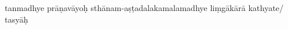    \begin{ekdosis}
      \begin{prose}
        tanmadhye prāṇavāyoḥ sthānam-aṣṭadalakamalamadhye liṃgākārā
        kathyate/   
tasyāḥ 
\end{prose}
\end{ekdosis}
